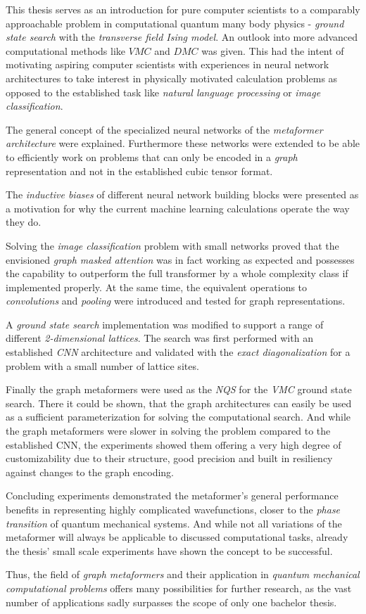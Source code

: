 This thesis serves as an introduction for pure computer scientists to a comparably approachable problem in computational quantum many body physics - \emph{ground state search} with the \emph{transverse field Ising model}.
An outlook into more advanced computational methods like $VMC$ and $DMC$ was given.
This had the intent of motivating aspiring computer scientists with experiences in neural network architectures to take interest in physically motivated calculation problems as opposed to the established task like \emph{natural language processing} or \emph{image classification}.

The general concept of the specialized neural networks of the \emph{metaformer architecture} were explained.
Furthermore these networks were extended to be able to efficiently work on problems that can only be encoded in a \emph{graph} representation and not in the established cubic tensor format.

The \emph{inductive biases} of different neural network building blocks were presented as a motivation for why the current machine learning calculations operate the way they do.

Solving the \emph{image classification} problem with small networks proved that the envisioned \emph{graph masked attention} was in fact working as expected and possesses the capability to outperform the full transformer by a whole complexity class if implemented properly.
At the same time, the equivalent operations to \emph{convolutions} and \emph{pooling} were introduced and tested for graph representations.

A \emph{ground state search} implementation was modified to support a range of different \emph{2-dimensional lattices}.
The search was first performed with an established \emph{CNN} architecture and validated with the \emph{exact diagonalization} for a problem with a small number of lattice sites.

Finally the graph metaformers were used as the \emph{NQS} for the \emph{VMC} ground state search.
There it could be shown, that the graph architectures can easily be used as a sufficient parameterization for solving the computational search.
And while the graph metaformers were slower in solving the problem compared to the established CNN, the experiments showed them offering a very high degree of customizability due to their structure, good precision and built in resiliency against changes to the graph encoding.

Concluding experiments demonstrated the metaformer's general performance benefits in representing highly complicated wavefunctions, closer to the \emph{phase transition} of quantum mechanical systems.
And while not all variations of the metaformer will always be applicable to discussed computational tasks, already the thesis' small scale experiments have shown the concept to be successful.

Thus, the field of \emph{graph metaformers} and their application in \emph{quantum mechanical computational problems} offers many possibilities for further research, as the vast number of applications sadly surpasses the scope of only one bachelor thesis.
